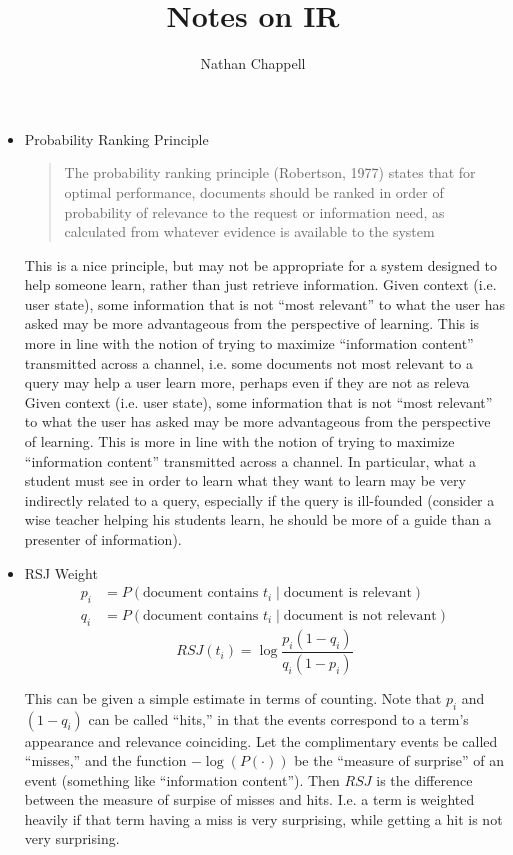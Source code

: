 \documentclass{article}
\title{Notes on IR}
\author{Nathan Chappell}
\begin{document}
\maketitle


\begin{itemize}
\item Probability Ranking Principle
    \begin{quote}
    The probability ranking principle (Robertson, 1977) states that for optimal performance, documents should be ranked in order of probability of relevance to the request or information need, as calculated from whatever evidence is available to the system
    \end{quote}

    This is a nice principle, but may not be appropriate for a system designed to help someone learn, rather than just retrieve information.  Given context (i.e. user state), some information that is not ``most relevant'' to what the user has asked may be more advantageous from the perspective of learning.  This is more in line with the notion of trying to maximize ``information content'' transmitted across a channel, i.e. some documents not most relevant to a query may help a user learn more, perhaps even if they are not as releva Given context (i.e. user state), some information that is not ``most relevant'' to what the user has asked may be more advantageous from the perspective of learning.  This is more in line with the notion of trying to maximize ``information content'' transmitted across a channel.  In particular, what a student must see in order to learn what they want to learn may be very indirectly related to a query, especially if the query is ill-founded (consider a wise teacher helping his students learn, he should be more of a guide than a presenter of information).

\item RSJ Weight
    \begin{align*}
    p_i & =  P(\text{document contains } t_i \;|\;\text{document is relevant}) \\
    q_i & =  P(\text{document contains } t_i \;|\;\text{document is not relevant})
    \end{align*}
    \[ RSJ(t_i) = \log\frac{p_i(1-q_i)}{q_i(1-p_i)} \]

    This can be given a simple estimate in terms of counting.  Note that $p_i$ and $(1-q_i)$ can be called ``hits,'' in that the events correspond to a term's appearance and relevance coinciding.  Let the complimentary events be called ``misses,'' and the function $-\log(P(\cdot))$ be the ``measure of surprise'' of an event (something like ``information content'').  Then $RSJ$ is the difference between the measure of surpise of misses and hits.  I.e. a term is weighted heavily if that term having a miss is very surprising, while getting a hit is not very surprising.


\end{itemize}
\end{document}
